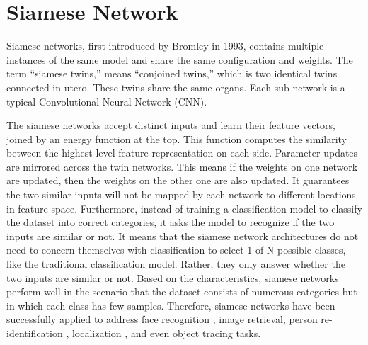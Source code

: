 \section{Siamese Network}

Siamese networks, first introduced by Bromley \cite{bromley1993signature} in 1993, contains multiple instances of the same model and share the same configuration and weights. The term “siamese twins,” means “conjoined twins,” which is two identical twins connected in utero. These twins share the same organs. Each sub-network is a typical Convolutional Neural Network (CNN).

The siamese networks accept distinct inputs and learn their feature vectors, joined by an energy function at the top. This function computes the similarity between the highest-level feature representation on each side. Parameter updates are mirrored across the twin networks. This means if the weights on one network are updated, then the weights on the other one are also updated. It guarantees the two similar inputs will not be mapped by each network to different locations in feature space. Furthermore, instead of training a classification model to classify the dataset into correct categories, it asks the model to recognize if the two inputs are similar or not. It means that the siamese network architectures do not need to concern themselves with classification to select 1 of N possible classes, like the traditional classification model. Rather, they only answer whether the two inputs are similar or not. Based on the characteristics, siamese networks perform well in the scenario that the dataset consists of numerous categories but in which each class has few samples. Therefore, siamese networks have been successfully applied to address face recognition \cite{schroff2015facenet}, image retrieval, person re-identification \cite{fang2019bilinear}, localization \cite{tompson2015efficient}, and even object tracing \cite{bertinetto2016fully} tasks. 


